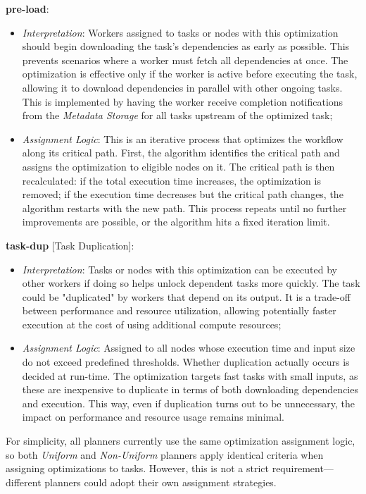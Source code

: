 \documentclass[conference]{IEEEtran}
\begin{document}
\textbf{pre-load}:
\begin{itemize}
  \item \textit{Interpretation}: Workers assigned to tasks or nodes with this optimization should begin downloading the task's dependencies as early as possible. This prevents scenarios where a worker must fetch all dependencies at once. The optimization is effective only if the worker is active before executing the task, allowing it to download dependencies in parallel with other ongoing tasks. This is implemented by having the worker receive completion notifications from the \textit{Metadata Storage} for all tasks upstream of the optimized task;
  \item \textit{Assignment Logic}: This is an iterative process that optimizes the workflow along its critical path. First, the algorithm identifies the critical path and assigns the optimization to eligible nodes on it. The critical path is then recalculated: if the total execution time increases, the optimization is removed; if the execution time decreases but the critical path changes, the algorithm restarts with the new path. This process repeats until no further improvements are possible, or the algorithm hits a fixed iteration limit.
\end{itemize}

\textbf{task-dup} [Task Duplication]:
\begin{itemize}
  \item \textit{Interpretation}: Tasks or nodes with this optimization can be executed by other workers if doing so helps unlock dependent tasks more quickly. The task could be "duplicated" by workers that depend on its output. It is a trade-off between performance and resource utilization, allowing potentially faster execution at the cost of using additional compute resources;
  \item \textit{Assignment Logic}: Assigned to all nodes whose execution time and input size do not exceed predefined thresholds. Whether duplication actually occurs is decided at run-time. The optimization targets fast tasks with small inputs, as these are inexpensive to duplicate in terms of both downloading dependencies and execution. This way, even if duplication turns out to be unnecessary, the impact on performance and resource usage remains minimal.
\end{itemize}

For simplicity, all planners currently use the same optimization assignment logic, so both \textit{Uniform} and \textit{Non-Uniform} planners apply identical criteria when assigning optimizations to tasks. However, this is not a strict requirement—different planners could adopt their own assignment strategies.
\end{document}
